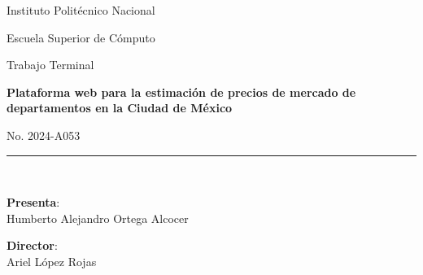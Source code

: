 \documentclass[12pt, a4paper, titlepage]{report} %
\begin{document}
\begin{titlepage}
  \vspace*{.25cm}
  \begin{center}
    \begin{LARGE}
      \textcolor{guindapoli}{Instituto Politécnico Nacional}\\
    \end{LARGE}
    \vspace*{0.2in}
    \begin{Large}
      \textcolor{azulescom}{Escuela Superior de Cómputo}\\
    \end{Large}
    \vspace*{0.4in}
    \begin{large}
      Trabajo Terminal
    \end{large}

    \vspace*{0.2in}

    \begin{Large}
      \textbf{Plataforma web para la estimación de precios de mercado de departamentos en la Ciudad de México}\\
    \end{Large}
    \vspace*{0.2in}
    \begin{large}
      No. 2024-A053\\
    \end{large}
    \vspace*{0.2in}
    \rule{80mm}{.1mm}\\
    \vspace*{0.1in}
    \begin{large}
      \begin{center}
        \textbf{Presenta}:\\
        Humberto Alejandro Ortega Alcocer\\
      \end{center}
    \end{large}
    \begin{large}
      \textbf{Director}:\\
      Ariel López Rojas\\
    \end{large}
  \end{center}
\end{titlepage}

  \newpage
\end{document}
